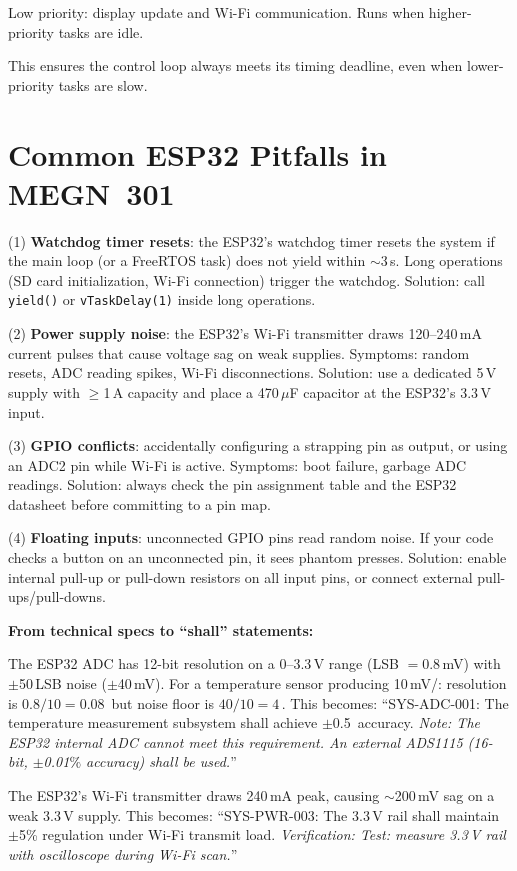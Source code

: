Low priority: display update and Wi-Fi communication. Runs when higher-priority tasks are idle.

This ensures the control loop always meets its timing deadline, even when lower-priority tasks are slow.

\section{Common ESP32 Pitfalls in MEGN~301}
(1) \textbf{Watchdog timer resets}: the ESP32's watchdog timer resets the system if the main loop (or a FreeRTOS task) does not yield within $\sim$3\,s. Long operations (SD card initialization, Wi-Fi connection) trigger the watchdog. Solution: call \texttt{yield()} or \texttt{vTaskDelay(1)} inside long operations.

(2) \textbf{Power supply noise}: the ESP32's Wi-Fi transmitter draws 120--240\,mA current pulses that cause voltage sag on weak supplies. Symptoms: random resets, ADC reading spikes, Wi-Fi disconnections. Solution: use a dedicated 5\,V supply with $\geq$1\,A capacity and place a 470\,$\mu$F capacitor at the ESP32's 3.3\,V input.

(3) \textbf{GPIO conflicts}: accidentally configuring a strapping pin as output, or using an ADC2 pin while Wi-Fi is active. Symptoms: boot failure, garbage ADC readings. Solution: always check the pin assignment table and the ESP32 datasheet before committing to a pin map.

(4) \textbf{Floating inputs}: unconnected GPIO pins read random noise. If your code checks a button on an unconnected pin, it sees phantom presses. Solution: enable internal pull-up or pull-down resistors on all input pins, or connect external pull-ups/pull-downs.
\begin{keyconceptbox}
\textbf{From technical specs to ``shall'' statements:}

The ESP32 ADC has 12-bit resolution on a 0--3.3\,V range (LSB $= 0.8$\,mV) with $\pm$50\,LSB noise ($\pm$40\,mV). For a temperature sensor producing 10\,mV/\degC{}: resolution is $0.8/10 = 0.08$\,\degC{} but noise floor is $40/10 = 4$\,\degC{}. This becomes: ``SYS-ADC-001: The temperature measurement subsystem shall achieve $\pm$0.5\,\degC{} accuracy. \emph{Note: The ESP32 internal ADC cannot meet this requirement. An external ADS1115 (16-bit, $\pm$0.01$\%$ accuracy) shall be used.}''

The ESP32's Wi-Fi transmitter draws 240\,mA peak, causing $\sim$200\,mV sag on a weak 3.3\,V supply. This becomes: ``SYS-PWR-003: The 3.3\,V rail shall maintain $\pm$5\% regulation under Wi-Fi transmit load. \emph{Verification: Test: measure 3.3\,V rail with oscilloscope during Wi-Fi scan.}''
\end{keyconceptbox}
